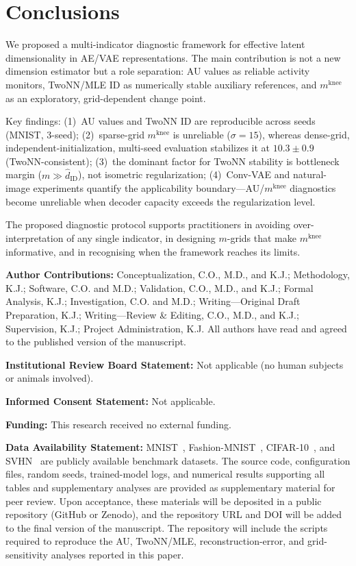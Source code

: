 \documentclass[make,article,submit,pdftex,moreauthors]{Definitions/mdpi}
\newcommand{\mknee}{m^{\mathrm{knee}}}
\newcommand{\hatdID}{\hat{d}_{\mathrm{ID}}}
\begin{document}
\section{Conclusions}\label{sec:conclusion}

We proposed a multi-indicator diagnostic framework for effective latent
dimensionality in AE/VAE representations.
The main contribution is not a new dimension estimator but a role separation:
AU values as reliable activity monitors, TwoNN/MLE ID as numerically stable
auxiliary references, and $\mknee$ as an exploratory, grid-dependent change point.

Key findings:
(1)~AU values and TwoNN ID are reproducible across seeds (MNIST, 3-seed);
(2)~sparse-grid $\mknee$ is unreliable ($\sigma=15$), whereas dense-grid,
independent-initialization, multi-seed evaluation stabilizes it at
$10.3\pm0.9$ (TwoNN-consistent);
(3)~the dominant factor for TwoNN stability is bottleneck margin
($m\gg\hatdID$), not isometric regularization;
(4)~Conv-VAE and natural-image experiments quantify the applicability
boundary---AU/$\mknee$ diagnostics become unreliable when decoder capacity
exceeds the regularization level.

The proposed diagnostic protocol supports practitioners in avoiding
over-interpretation of any single indicator, in designing $m$-grids that make
$\mknee$ informative, and in recognising when the framework reaches its limits.

\vspace{1ex}
\noindent\textbf{Author Contributions:}
Conceptualization, C.O., M.D., and K.J.;
Methodology, K.J.;
Software, C.O. and M.D.;
Validation, C.O., M.D., and K.J.;
Formal Analysis, K.J.;
Investigation, C.O. and M.D.;
Writing---Original Draft Preparation, K.J.;
Writing---Review \& Editing, C.O., M.D., and K.J.;
Supervision, K.J.;
Project Administration, K.J.
All authors have read and agreed to the published version of the manuscript.

\noindent\textbf{Institutional Review Board Statement:} Not applicable
(no human subjects or animals involved).

\noindent\textbf{Informed Consent Statement:} Not applicable.

\noindent\textbf{Funding:} This research received no external funding.

\noindent\textbf{Data Availability Statement:}
MNIST~\cite{lecun1998}, Fashion-MNIST~\cite{xiao2017fashion},
CIFAR-10~\cite{krizhevsky2009learning}, and SVHN~\cite{netzer2011reading}
are publicly available benchmark datasets.
The source code, configuration files, random seeds, trained-model logs, and
numerical results supporting all tables and supplementary analyses are provided
as supplementary material for peer review.
Upon acceptance, these materials will be deposited in a public repository
(GitHub or Zenodo), and the repository URL and DOI will be added to the final
version of the manuscript.
The repository will include the scripts required to reproduce the AU, TwoNN/MLE,
reconstruction-error, and grid-sensitivity analyses reported in this paper.
\end{document}
